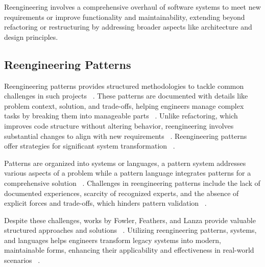 Reengineering involves a comprehensive overhaul of software systems to meet new requirements or improve functionality and maintainability, extending beyond refactoring or restructuring by addressing broader aspects like architecture and design principles.

\subsection{Reengineering Patterns}

Reengineering patterns provides structured methodologies to tackle common challenges in such projects ~\cite{SoftwareEvolutionMens2008}. These patterns are documented with details like problem context, solution, and trade-offs, helping engineers manage complex tasks by breaking them into manageable parts ~\cite{SoftwareEvolutionMens2008}. Unlike refactoring, which improves code structure without altering behavior, reengineering involves substantial changes to align with new requirements ~\cite{RefactoringFowler2002Improving}. Reengineering patterns offer strategies for significant system transformation ~\cite{RefactoringFowler2002Improving}.

Patterns are organized into systems or languages, a pattern system addresses various aspects of a problem while a pattern language integrates patterns for a comprehensive solution ~\cite{DevelopmentModels2010}. Challenges in reengineering patterns include the lack of documented experiences, scarcity of recognized experts, and the absence of explicit forces and trade-offs, which hinders pattern validation ~\cite{DevelopmentModels2010}.

Despite these challenges, works by Fowler, Feathers, and Lanza provide valuable structured approaches and solutions ~\cite{ContinuousEngineering2017}. Utilizing reengineering patterns, systems, and languages helps engineers transform legacy systems into modern, maintainable forms, enhancing their applicability and effectiveness in real-world scenarios ~\cite{ContinuousEngineering2017}.

